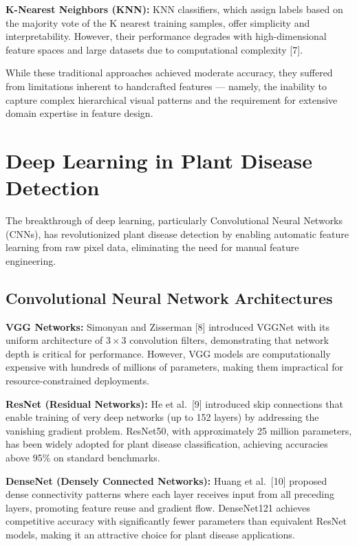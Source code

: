 \documentclass[12pt]{report}
\begin{document}
\textbf{K-Nearest Neighbors (KNN):} KNN classifiers, which assign labels based on the majority vote of the K nearest training samples, offer simplicity and interpretability. However, their performance degrades with high-dimensional feature spaces and large datasets due to computational complexity [7].

While these traditional approaches achieved moderate accuracy, they suffered from limitations inherent to handcrafted features --- namely, the inability to capture complex hierarchical visual patterns and the requirement for extensive domain expertise in feature design.

\section{Deep Learning in Plant Disease Detection}

The breakthrough of deep learning, particularly Convolutional Neural Networks (CNNs), has revolutionized plant disease detection by enabling automatic feature learning from raw pixel data, eliminating the need for manual feature engineering.

\subsection{Convolutional Neural Network Architectures}

\textbf{VGG Networks:} Simonyan and Zisserman [8] introduced VGGNet with its uniform architecture of $3 \times 3$ convolution filters, demonstrating that network depth is critical for performance. However, VGG models are computationally expensive with hundreds of millions of parameters, making them impractical for resource-constrained deployments.

\textbf{ResNet (Residual Networks):} He et al.\ [9] introduced skip connections that enable training of very deep networks (up to 152 layers) by addressing the vanishing gradient problem. ResNet50, with approximately 25 million parameters, has been widely adopted for plant disease classification, achieving accuracies above 95\% on standard benchmarks.

\textbf{DenseNet (Densely Connected Networks):} Huang et al.\ [10] proposed dense connectivity patterns where each layer receives input from all preceding layers, promoting feature reuse and gradient flow. DenseNet121 achieves competitive accuracy with significantly fewer parameters than equivalent ResNet models, making it an attractive choice for plant disease applications.
\end{document}
